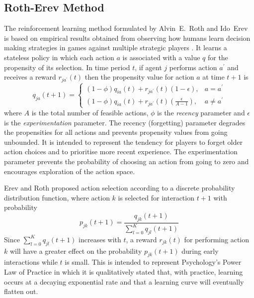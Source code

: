 \subsection{Roth-Erev Method}
\label{sec:rotherev}
The reinforcement learning method formulated by Alvin~E.~Roth and Ido~Erev is
based on empirical results obtained from observing how humans learn decision
making strategies in games against multiple strategic players
\cite{roth:games,roth:aer}.  It learns a stateless policy in which each action
$a$ is associated with a value $q$ for the propensity of its selection.  In
time period $t$, if agent $j$ performs action $a^\prime$ and receives a reward
$r_{ja^\prime}(t)$ then the propensity value for action $a$ at time $t+1$ is
\begin{equation}
\label{eq:rotherev}
q_{ja}(t+1) =
\begin{cases}
(1-\phi)q_{ia}(t) + r_{ja^\prime}(t)(1-\epsilon), & \text{$a = a^\prime$} \\
(1-\phi)q_{ia}(t) + r_{ja^\prime}(t)(\frac{\epsilon}{A-1}), & \text{$a \ne
a^\prime$}
\end{cases}
\end{equation}
where $A$ is the total number of feasible actions, $\phi$ is the
\textit{recency} parameter and $\epsilon$ is the \textit{experimentation} parameter.  The recency (forgetting) parameter
degrades the propensities for all actions and prevents propensity values from
going unbounded.  It is intended to represent the tendency for players to forget
older action choices and to prioritise more recent experience.  The
experimentation parameter prevents the probability of choosing an action from
going to zero and encourages exploration of the action space.

Erev and Roth proposed action selection according to a discrete probability
distribution function, where action $k$ is selected for interaction $t+1$ with
probability
\begin{equation}
\label{eq:re_prob}
p_{jk}(t+1) = \frac{q_{jk}(t+1)}{\sum_{l=0}^K q_{jl}(t+1)}
\end{equation}
Since $\sum_{l=0}^K q_{jl}(t+1)$ increases with $t$, a reward $r_{jk}(t)$ for
performing action $k$ will have a greater effect on the probability
$p_{jk}(t+1)$ during early interactions while $t$ is small.  This is intended
to represent Psychology's Power Law of Practice in which it is qualitatively
stated that, with practice, learning occurs at a decaying exponential rate and
that a learning curve will eventually flatten out.

